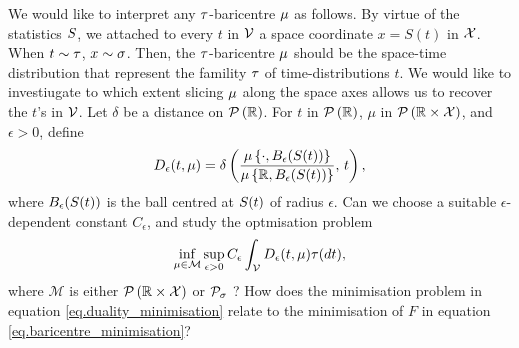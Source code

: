 We would like to interpret any 
$\tau$-baricentre 
$\mu$
as follows.
By virtue of the statistics $S$,
we attached to every $t$ in $\mathcal{V}$
a space coordinate $x = S(t)$ in $\mathcal{X}$. 
When $t\sim\tau$, $x\sim\sigma$.
Then, 
the  $\tau$-baricentre $\mu$
should be the space-time distribution that represent 
the famility $\tau$
of time-distributions $t$.
We would like to investiugate to which extent 
slicing $\mu$ along the space axes 
allows us 
to recover the $t$'s in $\mathcal{V}$. 
Let 
$\delta$ 
be a distance on $\mathcal{P}\left({\mathbb{R}}\right)$.
For $t$ in $\mathcal{P}\left({\mathbb{R}}\right)$,
$\mu$ in $\mathcal{P}\left({\mathbb{R}\times\mathcal{X}}\right)$,
and $\epsilon > 0$,
define
\begin{equation*}
D_{\epsilon}(t, \mu)
=
\delta
\left(
\frac
{
\mu\left\lbrace \cdot, B_\epsilon (S(t))\right\rbrace
}
{
\mu\left\lbrace \mathbb{R},  B_\epsilon (S(t))\right\rbrace
}
,
\,
t
\right)
,
\end{equation*}
where 
$B_\epsilon(S(t))$ 
is the ball centred at $S(t)$ of radius $\epsilon$.
Can we choose a suitable 
$\epsilon$-dependent constant $C_\epsilon$, 
and study the optmisation problem 
\begin{equation}
\label{eq.duality_minimisation}
\inf_{
\mu \in \mathcal{M}
}
\sup_{
\epsilon >0
}
C_\epsilon
\int_{\mathcal{V}}
D_\epsilon (t, \mu)
\tau(dt),
\end{equation}
where 
$\mathcal{M}$ is either 
$\mathcal{P}\left({\mathbb{R}\times\mathcal{X}}\right)$
or
$\mathcal{P}_{\sigma}$
?
How does 
the minimisation problem 
in equation \eqref{eq.duality_minimisation}
relate to
the minimisation of $F$ 
in equation \eqref{eq.baricentre_minimisation}?




